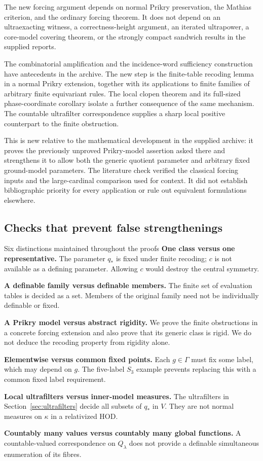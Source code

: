 \documentclass[11pt,letterpaper]{article}
\theoremstyle{definition}
\numberwithin{equation}{section}
\newcommand{\HOD}{\mathrm{HOD}}
\begin{document}
The new forcing argument depends on normal Prikry preservation, the
Mathias criterion, and the ordinary forcing theorem. It does not depend
on an ultraexacting witness, a correctness-height argument, an iterated
ultrapower, a core-model covering theorem, or the strongly compact
sandwich results in the supplied reports.

The combinatorial amplification and the incidence-word sufficiency
construction have antecedents in the archive. The new step is the
finite-table recoding lemma in a normal Prikry extension, together with
its applications to finite families of arbitrary finite equivariant
rules. The local clopen theorem and its full-sized phase-coordinate
corollary isolate a further consequence of the same mechanism. The
countable ultrafilter correspondence supplies a sharp local positive
counterpart to the finite obstruction.

This is new relative to the mathematical development in the supplied
archive: it proves the previously unproved Prikry-model assertion asked
there and strengthens it to allow both the generic quotient parameter
and arbitrary fixed ground-model parameters. The literature check
verified the classical forcing inputs and the large-cardinal comparison
used for context. It did not establish bibliographic priority for every
application or rule out equivalent formulations elsewhere.

\subsection{Checks that prevent false strengthenings}

\begin{assessment}{Six distinctions maintained throughout the proofs}
\textbf{One class versus one representative.}
The parameter $q_*$ is fixed under finite recoding; $c$ is not available
as a defining parameter. Allowing $c$ would destroy the central symmetry.

\textbf{A definable family versus definable members.}
The finite set of evaluation tables is decided as a set. Members of the
original family need not be individually definable or fixed.

\textbf{A Prikry model versus abstract rigidity.}
We prove the finite obstructions in a concrete forcing extension and
also prove that its generic class is rigid. We do not deduce the
recoding property from rigidity alone.

\textbf{Elementwise versus common fixed points.}
Each $g\in\Gamma$ must fix some label, which may depend on $g$. The
five-label $S_3$ example prevents replacing this with a common fixed
label requirement.

\textbf{Local ultrafilters versus inner-model measures.}
The ultrafilters in Section~\ref{sec:ultrafilters} decide all subsets
of $q_*$ in $V$. They are not normal measures on $\kappa$ in a
relativized $\HOD$.

\textbf{Countably many values versus countably many global functions.}
A countable-valued correspondence on $Q_\lambda$ does not provide a
definable simultaneous enumeration of its fibres.
\end{assessment}
\end{document}
